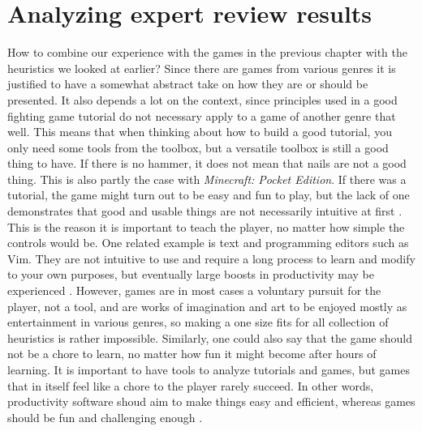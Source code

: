 \chapter{Analyzing expert review results}

How to combine our experience with the games in the previous chapter with the heuristics we looked at earlier? Since there are games from various genres it is justified to have a somewhat abstract take on how they are or should be presented. It also depends a lot on the context, since principles used in a good fighting game tutorial do not necessary apply to a game of another genre that well. This means that when thinking about how to build a good tutorial, you only need some tools from the toolbox, but a versatile toolbox is still a good thing to have. If there is no hammer, it does not mean that nails are not a good thing. This is also partly the case with \textit{Minecraft: Pocket Edition}. If there was a tutorial, the game might turn out to be easy and fun to play, but the lack of one demonstrates that good and usable things are not necessarily intuitive at first \cite{Raskin1994}. This is the reason it is important to teach the player, no matter how simple the controls would be. One related example is text and programming editors such as Vim. They are not intuitive to use and require a long process to learn and modify to your own purposes, but eventually large boosts in productivity may be experienced \cite{Robbins2008}. However, games are in most cases a voluntary pursuit for the player, not a tool, and are works of imagination and art to be enjoyed mostly as entertainment in various genres, so making a one size fits for all collection of heuristics is rather impossible. Similarly, one could also say that the game should not be a chore to learn, no matter how fun it might become after hours of learning. It is important to have tools to analyze tutorials and games, but games that in itself feel like a chore to the player rarely succeed. In other words, productivity software shoud aim to make things easy and efficient, whereas games should be fun and challenging enough \cite{Pagulayan2003}. 

